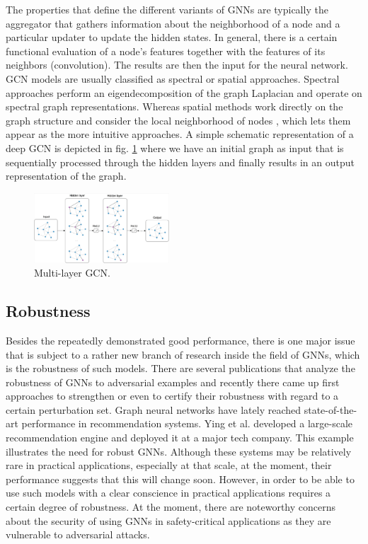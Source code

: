 \documentclass[a4paper,preprint]{sig-alternate}
\begin{document}
The properties that define the different variants of GNNs are typically the aggregator that gathers 
information about the neighborhood of a node and a particular updater to update the hidden states. \cite{Zhou_2019}
In general, there is a certain functional evaluation of a node's features together with the features of its neighbors (convolution). 
The results are then the input for the neural network. GCN models are usually classified as spectral or spatial approaches.
Spectral approaches perform an eigendecomposition of the graph Laplacian and operate on spectral graph representations. \cite{Zhou_2019}
Whereas spatial methods work directly on the graph structure and consider the local neighborhood of nodes \cite{Zhou_2019},
which lets them appear as the more intuitive approaches.
A simple schematic representation of a deep GCN is depicted in fig. \ref{fig:gcn} where we have an initial graph as input
that is sequentially processed through the hidden layers and finally results in an output representation of the graph.
\begin{figure}[h]
    \centering
    \includegraphics[width=0.45\textwidth]{img/gcn.png}
    \caption{Multi-layer GCN. \cite{Kipf_2016}}
    \label{fig:gcn}
\end{figure}

\subsection{Robustness}
\label{subsec:bg2}

Besides the repeatedly demonstrated good performance, there is one major issue that is subject to a rather new branch of 
research inside the field of GNNs, which is the robustness of such models. There are several publications that analyze 
the robustness of GNNs to adversarial examples and recently there came up first approaches to strengthen
or even to certify their robustness with regard to a certain perturbation set.\newline
Graph neural networks have lately reached state-of-the-art performance in recommendation systems. \cite{Ying_2018}
Ying et al. developed a large-scale recommendation engine and deployed it at a major tech company.
This example illustrates the need for robust GNNs. Although these systems may be relatively rare in practical applications, especially at
that scale, at the moment, their performance suggests that this will change soon. However, in order to be able to use such models
with a clear conscience in practical applications requires a certain degree of robustness.
At the moment, there are noteworthy concerns about the security of using GNNs in safety-critical applications as they are
vulnerable to adversarial attacks. \cite{Jin_2020_Graph}\newline
\end{document}
